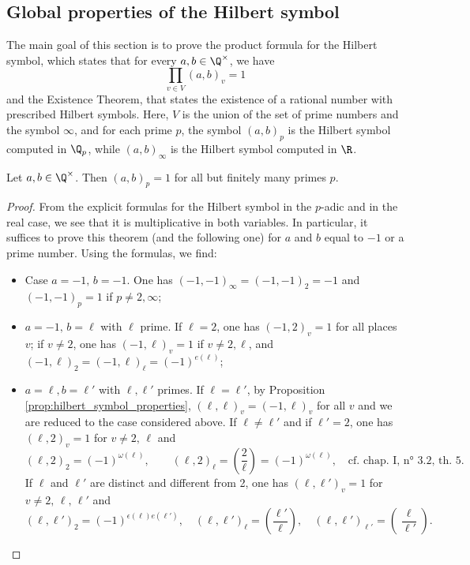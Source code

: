 \subsection{Global properties of the Hilbert symbol}
The main goal of this section is to prove
the product formula for the Hilbert symbol, which states that for every $a, b \in \Q^\times$, we have
\[\prod_{v \in V} (a, b)_v = 1\]
and the Existence Theorem, that states the existence of a rational number with prescribed Hilbert symbols.
Here, $V$ is the union of the set of prime numbers and the symbol $\infty$, and for each prime $p$,
the symbol $(a, b)_p$ is the Hilbert symbol computed in $\Q_p$, while $(a, b)_\infty$ is the Hilbert
symbol computed in $\R$.


\begin{theorem}
	\label{thm:almost_all_one}
	\leanok
Let $a, b \in \Q^\times$. Then $(a, b)_p = 1$ for all but finitely many primes $p$.
\end{theorem}

\begin{proof}
\leanok
	From the explicit formulas for the Hilbert symbol in the $p$-adic and in the real case, we see
	that it is multiplicative in both variables. 	In particular, it suffices to prove this theorem
	(and the following one) for $a$ and $b$ equal to $-1$ or
	a prime number. Using the formulas, we find:
	\begin{itemize}
	\item Case $a = -1, \, b = -1$. One has $(-1, -1)_\infty = (-1, -1)_2 = -1$ and
	$(-1, -1)_p = 1$ if $p \ne 2, \infty$;
  \item $a = -1, \, b = \ell$ with $\ell$ prime. If $\ell=2$, one has $(-1, 2)_v = 1$
	for all places $v$; if $v \ne 2$, one has $(-1, \ell)_v = 1$ if $v \ne 2, \ell$,
	and $(-1, \ell)_2 = (-1, \ell)_{\ell} = (-1)^{e(\ell)}$;
  \item $a = \ell, b = \ell'$ with $\ell, \ell'$ primes. If $\ell = \ell'$, by Proposition
	\ref{prop:hilbert_symbol_properties}, $(\ell, \ell)_v = (-1, \ell)_v$ for all $v$ and we are
	reduced to the case considered above. If $\ell \ne \ell'$ and if $\ell' = 2$, one has
	$(\ell, 2)_v = 1$ for $v \ne 2, \, \ell$ and
\[
(\ell, 2)_2 = (-1)^{\omega(\ell)}, \qquad (\ell, 2)_{\ell} = \left(\frac{2}{\ell}\right) = (-1)^{\omega(\ell)}, \quad \text{cf. chap. I, n° 3.2, th. 5.}
\]
If \( \ell \) and \( \ell' \) are distinct and different from 2, one has \( (\ell, \ell')_v = 1 \) for \( v \neq 2, \, \ell, \, \ell' \) and
\[
(\ell, \ell')_2 = (-1)^{\epsilon(\ell)e(\ell')}, \quad (\ell, \ell')_{\ell} = \left(\frac{\ell'}{\ell}\right), \quad (\ell, \ell')_{\ell'} = \left(\frac{\ell}{\ell'}\right).
\]
\end{itemize}
\end{proof}

